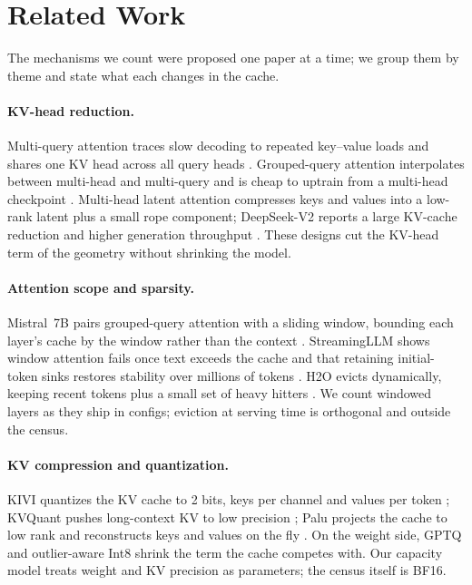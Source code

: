 \section{Related Work}
\label{sec:related-work}

The mechanisms we count were proposed one paper at a time; we group them by
theme and state what each changes in the cache.

\paragraph{KV-head reduction.}
Multi-query attention traces slow decoding to repeated key--value loads and
shares one KV head across all query heads \cite{shazeer2019mqa}. Grouped-query
attention interpolates between multi-head and multi-query and is cheap to
uptrain from a multi-head checkpoint \cite{ainslie2023gqa}. Multi-head latent attention compresses keys and values
into a low-rank latent plus a small rope component; DeepSeek-V2 reports a
large KV-cache reduction and higher generation throughput
\cite{deepseekai2024v2}. These designs cut the KV-head term of the geometry
without shrinking the model.

\paragraph{Attention scope and sparsity.}
Mistral~7B pairs grouped-query attention with a sliding window, bounding each
layer's cache by the window rather than the context \cite{jiang2023mistral}.
StreamingLLM shows window attention fails once text exceeds the cache and that
retaining initial-token sinks restores stability over millions of tokens
\cite{xiao2023streamingllm}. H2O evicts dynamically, keeping recent tokens plus
a small set of heavy hitters \cite{zhang2023h2o}. We count windowed layers as
they ship in configs; eviction at serving time is orthogonal and outside the
census.

\paragraph{KV compression and quantization.}
KIVI quantizes the KV cache to 2 bits, keys per channel and values per token
\cite{liu2024kivi}; KVQuant pushes long-context KV to low precision
\cite{hooper2024kvquant}; Palu projects the cache to low rank and reconstructs
keys and values on the fly \cite{chang2024palu}. On the weight side, GPTQ
\cite{frantar2022gptq} and outlier-aware Int8 \cite{dettmers2022int8} shrink
the term the cache competes with. Our capacity model treats weight and KV
precision as parameters; the census itself is BF16.

